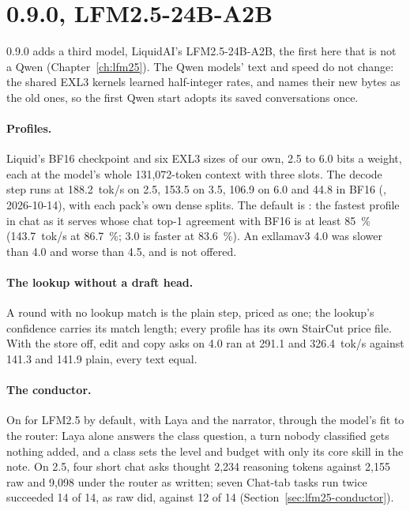 \section{0.9.0, LFM2.5-24B-A2B}\label{sec:changelog-090}

0.9.0 adds a third model, LiquidAI's LFM2.5-24B-A2B, the first here that is not a Qwen (Chapter~\ref{ch:lfm25}). The Qwen models' text and speed do not change: the shared EXL3 kernels learned half-integer rates, and  names their new bytes as the old ones, so the first Qwen start adopts its saved conversations once.

\paragraph{Profiles.} Liquid's BF16 checkpoint and six EXL3 sizes of our own, 2.5 to 6.0 bits a weight, each at the model's whole 131,072-token context with three slots. The decode step runs at 188.2~tok/s on 2.5, 153.5 on 3.5, 106.9 on 6.0 and 44.8 in BF16 (\measured, 2026-10-14), with each pack's own dense splits. The default is : the fastest profile in chat as it serves whose chat top-1 agreement with BF16 is at least 85~\% (143.7~tok/s at 86.7~\%; 3.0 is faster at 83.6~\%). An exllamav3  4.0 was slower than 4.0 and worse than 4.5, and is not offered.

\paragraph{The lookup without a draft head.} A round with no lookup match is the plain step, priced as one; the lookup's confidence carries its match length; every profile has its own StairCut price file. With the store off, edit and copy asks on 4.0 ran at 291.1 and 326.4~tok/s against 141.3 and 141.9 plain, every text equal.

\paragraph{The conductor.} On for LFM2.5 by default, with Laya and the narrator, through the model's fit to the router: Laya alone answers the class question, a turn nobody classified gets nothing added, and a class sets the level and budget with only its core skill in the note. On 2.5, four short chat asks thought 2,234 reasoning tokens against 2,155 raw and 9,098 under the router as written; seven Chat-tab tasks run twice succeeded 14 of 14, as raw did, against 12 of 14 (Section~\ref{sec:lfm25-conductor}).

